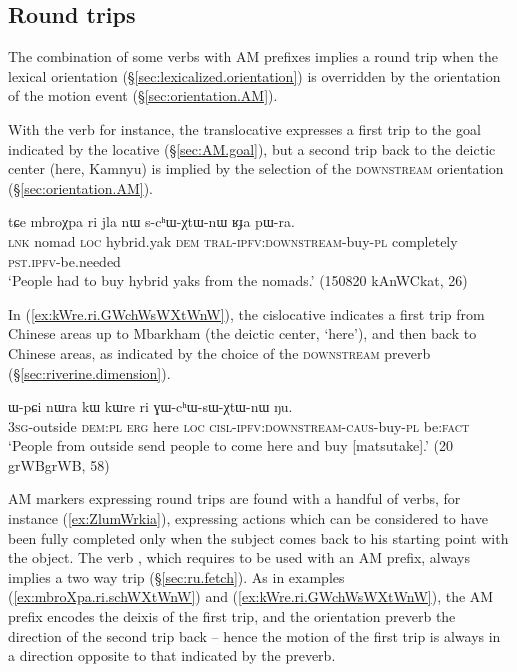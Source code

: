 \subsection{Round trips} \label{sec:round.trip.AM}
The combination of some verbs with AM prefixes implies a round trip when the lexical orientation (§\ref{sec:lexicalized.orientation}) is overridden by the orientation of the motion event (§\ref{sec:orientation.AM}). 

With the verb  for instance, the translocative expresses a first trip to the goal indicated by the locative  (§\ref{sec:AM.goal}), but a second trip back to the deictic center (here, Kamnyu) is implied by the selection of the \textsc{downstream} orientation (§\ref{sec:orientation.AM}).  

 \begin{exe}
\ex \label{ex:mbroXpa.ri.schWXtWnW}
\gll tɕe mbroχpa ri jla nɯ s-cʰɯ-χtɯ-nɯ ʁɟa pɯ-ra. \\
\textsc{lnk} nomad \textsc{loc} hybrid.yak \textsc{dem}  \textsc{tral}-\textsc{ipfv}:\textsc{downstream}-buy-\textsc{pl} completely \textsc{pst}.\textsc{ipfv}-be.needed \\
\glt `People had to buy hybrid yaks from the nomads.' (150820 kAnWCkat, 26)
\end{exe}

In (\ref{ex:kWre.ri.GWchWsWXtWnW}), the cislocative indicates a first trip from Chinese areas up to Mbarkham (the deictic center,  `here'), and then back to Chinese areas, as indicated by the choice of the \textsc{downstream} preverb (§\ref{sec:riverine.dimension}).

\begin{exe}
\ex \label{ex:kWre.ri.GWchWsWXtWnW}
\gll   ɯ-pɕi nɯra kɯ kɯre ri ɣɯ-cʰɯ-sɯ-χtɯ-nɯ ŋu.  \\
  \textsc{3sg}-outside  \textsc{dem}:\textsc{pl}  \textsc{erg} here \textsc{loc} \textsc{cisl}-\textsc{ipfv}:\textsc{downstream}-\textsc{caus}-buy-\textsc{pl} be:\textsc{fact} \\ 
\glt `People from outside send people to come here and buy [matsutake].' (20 grWBgrWB, 58)  
  \end{exe} 

AM markers expressing round trips are found with a handful of verbs, for instance  (\ref{ex:ZlumWrkia}), expressing actions which can be considered to have been fully completed only when the subject comes back to his starting point with the object.  The verb , which requires to be used with an AM prefix, always implies a two way trip (§\ref{sec:ru.fetch}). As in examples (\ref{ex:mbroXpa.ri.schWXtWnW}) and (\ref{ex:kWre.ri.GWchWsWXtWnW}), the AM prefix encodes the deixis of the first trip, and the orientation preverb the direction of the second trip back -- hence the motion of the first trip is always in a direction opposite to that indicated by the preverb.
 


